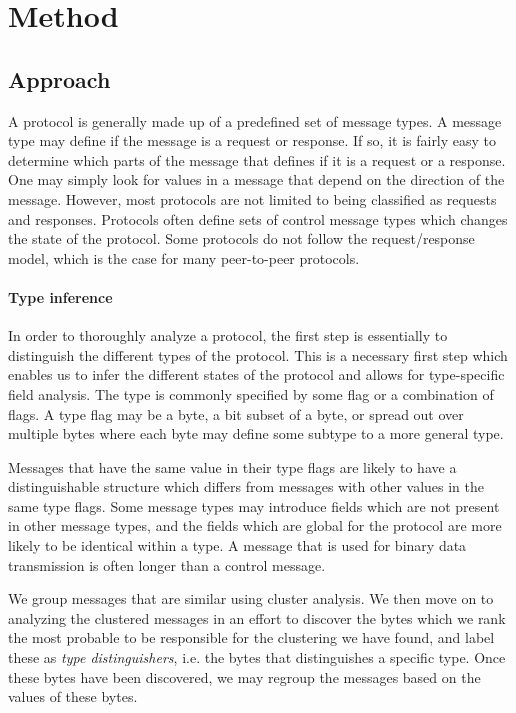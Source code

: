 \documentclass[a4paper]{report}
\begin{document}
\chapter{Method}

\section{Approach}
A protocol is generally made up of a predefined set of message types. A
message type may define if the message is a request or response. If so, it is
fairly easy to determine which parts of the message that defines if it is a
request or a response. One may simply look for values in a message that depend
on the direction of the message. However, most protocols are not limited to
being classified as requests and responses. Protocols often define sets of
control message types which changes the state of the protocol. Some protocols
do not follow the request/response model, which is the case for many
peer-to-peer protocols.

\subsubsection{Type inference}
In order to thoroughly analyze a protocol, the first step is essentially to
distinguish the different types of the protocol. This is a necessary first
step which enables us to infer the different states of the protocol and allows
for type-specific field analysis. The type is commonly specified by some flag
or a combination of flags. A type flag may be a byte, a bit subset of a byte,
or spread out over multiple bytes where each byte may define some subtype to a
more general type.

Messages that have the same value in their type flags are likely to have a
distinguishable structure which differs from messages with other values in the
same type flags. Some message types may introduce fields which are not present
in other message types, and the fields which are global for the protocol are
more likely to be identical within a type. A message that is used for binary
data transmission is often longer than a control message.

We group messages that are similar using cluster analysis. We then move on to
analyzing the clustered messages in an effort to discover the bytes which we
rank the most probable to be responsible for the clustering we have found, and
label these as \emph{type distinguishers}, i.e. the bytes that distinguishes a
specific type. Once these bytes have been discovered, we may regroup the
messages based on the values of these bytes.
\end{document}
